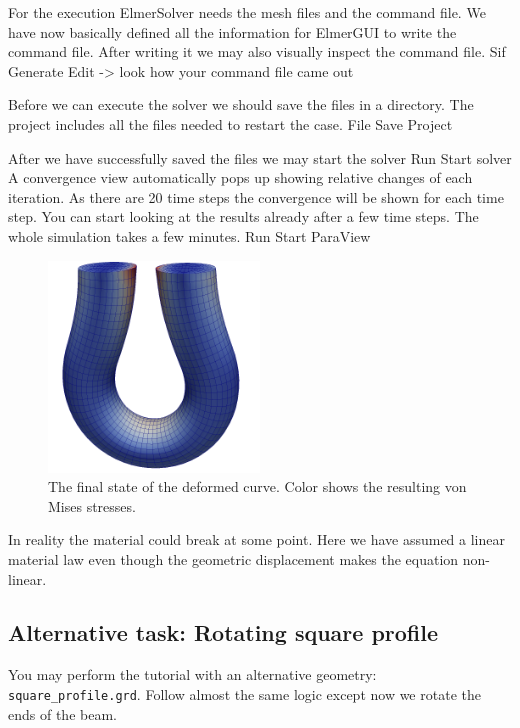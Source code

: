 For the execution 
ElmerSolver needs the mesh files and the command file. We have now basically defined
all the information for ElmerGUI to write the command file. After writing it we may also visually 
inspect the command file.
\ttbegin
Sif 
  Generate
  Edit -> look how your command file came out  
\ttend

Before we can execute the solver we should save the files in a directory. The project includes
all the files needed to restart the case.
\ttbegin
File 
  Save Project
\ttend

After we have successfully saved the files we may start the solver
\ttbegin
Run
  Start solver
\ttend
A convergence view automatically pops up showing relative changes of each iteration.
As there are 20 time steps the convergence will be shown for each time step.
You can start looking at the results already after a few time steps. The whole simulation
takes a few minutes. 
\ttbegin
Run
  Start ParaView
\ttend


\begin{figure}[h!]
\begin{center}
  \includegraphics[width=0.5\textwidth]{UturnVonMisesStressMesh}
  \caption{The final state of the deformed curve. Color shows the resulting von Mises stresses.}
  \label{fig:UturnVonMisesStress}
\end{center}
\end{figure}

In reality the material could break at some point. Here we have assumed a linear material law
even though the geometric displacement makes the equation non-linear. 


\subsection*{Alternative task: Rotating square profile}

You may perform the tutorial with an alternative geometry: \texttt{square\_profile.grd}.
Follow almost the same logic except now we rotate the ends of the beam.

